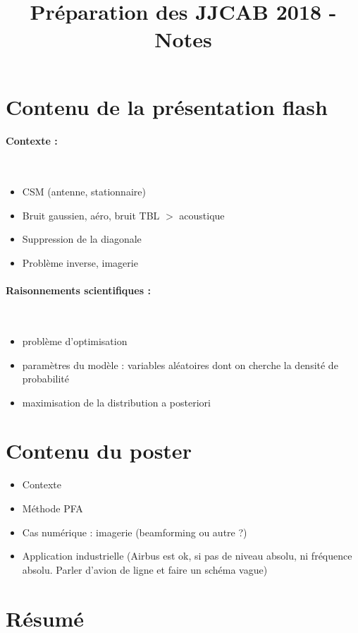 \documentclass[12pt]{article}
\title{\vspace{-12mm}\fontsize{14pt}{14pt}\selectfont\textbf{Préparation des JJCAB 2018 - Notes}} %
\date{\vspace{-1cm}
}
\begin{document}
\maketitle 
\section*{Contenu de la présentation flash}

\paragraph{Contexte : }~\\
\begin{itemize}
        \item CSM (antenne, stationnaire)
        \item Bruit gaussien, aéro, bruit TBL $>$ acoustique
        \item Suppression de la diagonale
        \item Problème inverse, imagerie
\end{itemize}
\paragraph{Raisonnements scientifiques : }~\\
\begin{itemize}
        \item problème d'optimisation
        \item paramètres du modèle : variables aléatoires dont on cherche la densité de probabilité
        \item maximisation de la distribution a posteriori
\end{itemize}

\section*{Contenu du poster}
\begin{itemize}
        \item Contexte
        \item Méthode PFA
        \item Cas numérique : imagerie  (beamforming ou  autre ?)
        \item Application industrielle (Airbus est ok, si pas de niveau absolu, ni fréquence absolu. Parler d'avion de ligne et faire un schéma vague)
\end{itemize}


\section*{Résumé}
\end{document}

